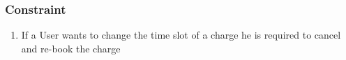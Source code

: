 \subsubsection{Constraint}
\begin{enumerate}[label=C\arabic*]
      \item If a User wants to change the time slot of a charge he is required to cancel and re-book the charge
\end{enumerate}

\clearpage